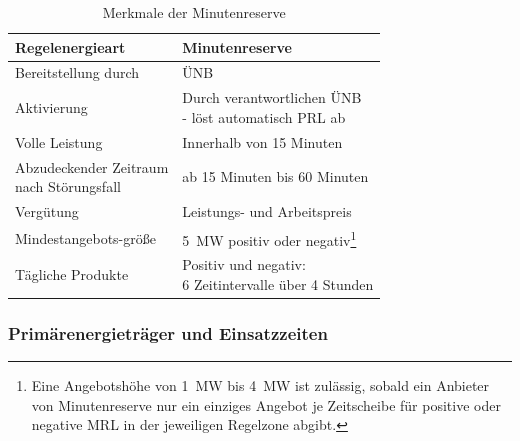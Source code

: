 			\begin{table}[H]
				\centering
				\caption{Merkmale der Minutenreserve}
				\label{Merkmale der Minutenreserve}
				\begin{tabular}{ll}
					\hline
					Regelenergieart  & Minutenreserve \\ \hline
					Bereitstellung durch & ÜNB \\
					Aktivierung & \makecell[l]{Durch verantwortlichen ÜNB \\ - löst automatisch PRL ab}\\
					Volle Leistung & Innerhalb von 15 Minuten \\
					\makecell[l]{Abzudeckender Zeitraum \\ nach Störungsfall} & ab 15 Minuten bis 60 Minuten \\
					Vergütung & Leistungs- und Arbeitspreis \\
					Mindestangebots-größe & \SI{5}{\mega\watt} positiv oder negativ\footnote{Eine Angebotshöhe von \SI{1}{\mega\watt} bis \SI{4}{\mega\watt} ist zulässig, sobald ein Anbieter von Minutenreserve nur ein einziges Angebot je Zeitscheibe für positive oder negative MRL in der jeweiligen Regelzone abgibt.} \\
					Tägliche Produkte & \makecell[l]{Positiv und negativ: \\ \num{6} Zeitintervalle über \num{4} Stunden} \\ \hline
				\end{tabular}
			\end{table}
		
		\subsubsection{Primärenergieträger und Einsatzzeiten}
			
			
			
